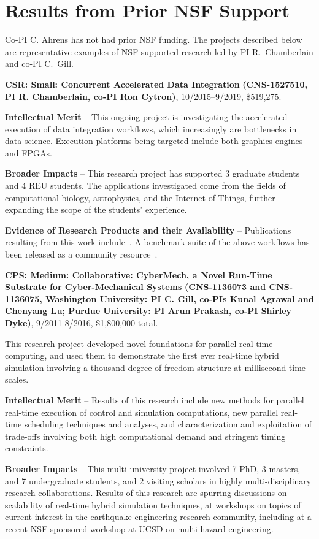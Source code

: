 \section{Results from Prior NSF Support}
\label{sec:prior}

Co-PI C. Ahrens has not had prior NSF funding. The projects described
below are representative examples of NSF-supported research led by PI 
R.~Chamberlain and co-PI C.~Gill.

\noindent
{\large\bf CSR: Small: Concurrent Accelerated Data Integration}
{\bf (CNS-1527510,
PI R. Chamberlain, co-PI Ron Cytron)}, 
10/2015--9/2019, \$519,275.  

\textbf{Intellectual Merit} -- This ongoing project is investigating the
accelerated execution of data integration workflows, which
increasingly are bottlenecks in data science. Execution platforms
being targeted include both graphics engines and FPGAs.

\textbf{Broader Impacts} -- This research project has supported 3
graduate students and 4 REU students.  The applications investigated
come from the fields of computational biology, astrophysics, and the
Internet of Things, further expanding the scope of the students'
experience.

\textbf{Evidence of Research Products and their Availability} --
Publications resulting from this work include~\cite{dibs,c17,mgc16,js16}.
A benchmark suite of the above workflows has been released
as a community resource~\cite{dibsv1}.

\noindent
{\large\bf CPS: Medium: Collaborative: CyberMech, a Novel Run-Time Substrate for 
Cyber-Mechanical Systems}
{\bf (CNS-1136073 and CNS-1136075,
Washington University: PI C. Gill, co-PIs Kunal Agrawal and Chenyang Lu; Purdue University: PI Arun Prakash, co-PI Shirley Dyke)}, 9/2011-8/2016, \$1,800,000 total.  

This research project developed novel foundations for parallel real-time computing, and used them to demonstrate the first ever real-time hybrid simulation involving a thousand-degree-of-freedom structure at millisecond time scales.

\textbf{Intellectual Merit} -- Results of this research include new methods for parallel real-time execution of control and simulation computations, new parallel real-time scheduling techniques and analyses, and characterization and exploitation of trade-offs involving both high computational demand and stringent timing constraints.

\textbf{Broader Impacts} -- This multi-university project involved 7 PhD, 3 masters, and 7 undergraduate students, and 2 visiting scholars in highly multi-disciplinary research collaborations.  Results of this research are spurring discussions on scalability of real-time hybrid simulation techniques, at workshops on topics of current interest in the earthquake engineering research community, including at a recent NSF-sponsored workshop at UCSD on multi-hazard engineering.

